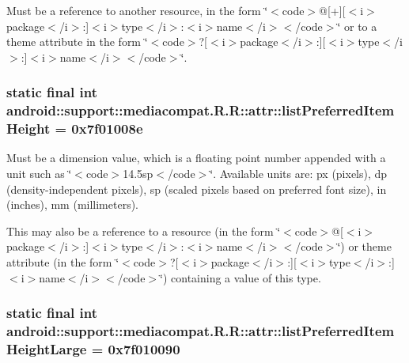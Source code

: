Must be a reference to another resource, in the form \char`\"{}$<$code$>$@\mbox{[}+\mbox{]}\mbox{[}$<$i$>$package$<$/i$>$:\mbox{]}$<$i$>$type$<$/i$>$:$<$i$>$name$<$/i$>$$<$/code$>$\char`\"{} or to a theme attribute in the form \char`\"{}$<$code$>$?\mbox{[}$<$i$>$package$<$/i$>$:\mbox{]}\mbox{[}$<$i$>$type$<$/i$>$:\mbox{]}$<$i$>$name$<$/i$>$$<$/code$>$\char`\"{}. \hypertarget{classandroid_1_1support_1_1mediacompat_1_1_r_1_1attr_583a2f8303d9e545e1a1a49adf2d3328}{
\subsubsection[{listPreferredItemHeight}]{\setlength{\rightskip}{0pt plus 5cm}static final int android::support::mediacompat.R.R::attr::listPreferredItemHeight = 0x7f01008e}}
\label{classandroid_1_1support_1_1mediacompat_1_1_r_1_1attr_583a2f8303d9e545e1a1a49adf2d3328}


Must be a dimension value, which is a floating point number appended with a unit such as \char`\"{}$<$code$>$14.5sp$<$/code$>$\char`\"{}. Available units are: px (pixels), dp (density-independent pixels), sp (scaled pixels based on preferred font size), in (inches), mm (millimeters). 

This may also be a reference to a resource (in the form \char`\"{}$<$code$>$@\mbox{[}$<$i$>$package$<$/i$>$:\mbox{]}$<$i$>$type$<$/i$>$:$<$i$>$name$<$/i$>$$<$/code$>$\char`\"{}) or theme attribute (in the form \char`\"{}$<$code$>$?\mbox{[}$<$i$>$package$<$/i$>$:\mbox{]}\mbox{[}$<$i$>$type$<$/i$>$:\mbox{]}$<$i$>$name$<$/i$>$$<$/code$>$\char`\"{}) containing a value of this type. \hypertarget{classandroid_1_1support_1_1mediacompat_1_1_r_1_1attr_a8ace72ca6f0a8415ddebfac0ee49b77}{
\subsubsection[{listPreferredItemHeightLarge}]{\setlength{\rightskip}{0pt plus 5cm}static final int android::support::mediacompat.R.R::attr::listPreferredItemHeightLarge = 0x7f010090}}
\label{classandroid_1_1support_1_1mediacompat_1_1_r_1_1attr_a8ace72ca6f0a8415ddebfac0ee49b77}


